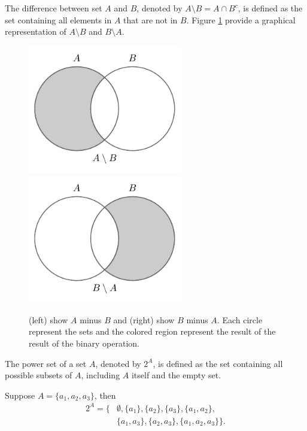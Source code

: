 \begin{definition}[Difference]
	The difference between set $A$ and $B$, denoted by $A \setminus B = A\cap B^c$, is defined as the set containing all elements in $A$ that are not in $B$. Figure \ref{fig:set_minus} provide a graphical representation of $A\setminus B$ and $B\setminus A$.
	\begin{figure}[H]
		\centering
		\includegraphics[width = 0.6\textwidth]{figures/set_minus.pdf}
		\includegraphics[width = 0.6\textwidth]{figures/set_minus2.pdf}
		\caption{(left) show $A$ minus $B$ and (right) show $B$ minus $A$. Each circle represent the sets and the colored region represent the result of the result of the binary operation.}
		\label{fig:set_minus}
	\end{figure}
\end{definition}

\begin{definition}
	The power set of a set $A$, denoted by $2^A$, is defined as the set containing all possible subsets of $A$, including $A$ itself and the empty set.
\end{definition}

\begin{example}
	Suppose $A = \{a_1,a_2,a_3\}$, then
	\begin{equation}
		\begin{split}
			2^A = \{&\emptyset, \{a_1\}, \{a_2\}, \{a_3\}, \{a_1, a_2\},\\
			& \{a_1, a_3\}, \{a_2, a_3\}, \{a_1, a_2, a_3\}\}.
		\end{split}
	\end{equation}
\end{example}


